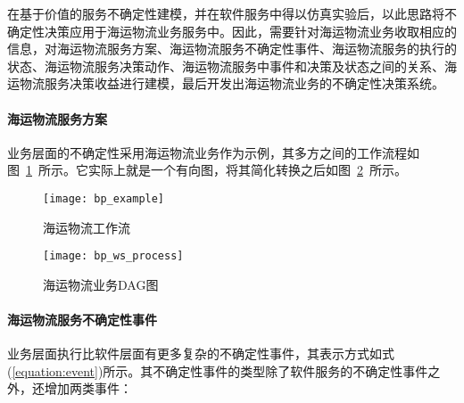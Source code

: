 在基于价值的服务不确定性建模，并在软件服务中得以仿真实验后，以此思路将不确定性决策应用于海运物流业务服务中。因此，需要针对海运物流业务收取相应的信息，对海运物流服务方案、海运物流服务不确定性事件、海运物流服务的执行的状态、海运物流服务决策动作、海运物流服务中事件和决策及状态之间的关系、海运物流服务决策收益进行建模，最后开发出海运物流业务的不确定性决策系统。

\setcounter{paragraph}{0}
\paragraph{海运物流服务方案}

%

业务层面的不确定性采用海运物流业务作为示例，其多方之间的工作流程如图~\ref{figure:bp_example}~所示。它实际上就是一个有向图，将其简化转换之后如图~\ref{figure:bp_ws_process}~所示。

\begin{figure}[htbp]
    \centering
    \texttt{[image: bp\_example]}
    \caption{海运物流工作流}\label{figure:bp_example}
    \vspace{-1em}
\end{figure}

\begin{figure}[htbp]
    \centering
    \texttt{[image: bp\_ws\_process]}
    \caption{海运物流业务DAG图}\label{figure:bp_ws_process}
    \vspace{-1em}
\end{figure}

\paragraph{海运物流服务不确定性事件}

业务层面执行比软件层面有更多复杂的不确定性事件，其表示方式如式(\ref{equation:event})所示。其不确定性事件的类型除了软件服务的不确定性事件之外，还增加两类事件：

